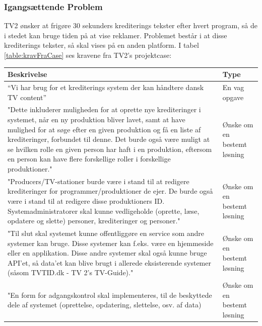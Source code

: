 \subsubsection{Igangsættende Problem}
TV2 ønsker at frigøre 30 sekunders krediterings tekster efter hvert program, så de i stedet kan bruge tiden på at vise reklamer. Problemet består i at disse krediterings tekster, så skal vises på en anden platform. I tabel \ref{table:kravFraCase} ses kravene fra TV2's projektcase: \\

\begin{table}[ht]
    \begin{tabularx}{\textwidth}{|p{10cm}|X|}
        \hline
        \textbf{Beskrivelse} & \textbf{Type} \\
        \hline
        “Vi har brug for  et krediterings system der kan  håndtere  dansk TV content” 
        & En vag opgave \\
        
        \hline
        "Dette inkluderer muligheden for at oprette nye krediteringer i systemet, når en ny produktion bliver lavet, samt at have mulighed for at søge efter en given produktion og få en liste af krediteringer, forbundet til denne. Det burde også være muligt at se hvilken rolle en given person har haft i en produktion, eftersom en person kan have flere forskellige roller i forskellige produktioner."
        & Ønske om en bestemt løsning \\
        
        \hline 
        "Producers/TV-stationer burde være i stand til at redigere krediteringer for programmer/produktioner de ejer. De burde også være i stand til at redigere disse produktioners ID. Systemadministratorer skal kunne vedligeholde (oprette, læse, opdatere og slette) personer, krediteringer og personer."
        & Ønske om en bestemt løsning \\
        
        \hline
        "Til slut skal systemet kunne offentliggøre en service som andre systemer kan bruge. Disse systemer kan f.eks. være en hjemmeside eller en applikation. Disse andre systemer skal også kunne bruge API'et, så data'et kan blive brugt i allerede eksisterende systemer (såsom TVTID.dk - TV 2's TV-Guide)."
        & Ønske om en bestemt løsning \\
        
        \hline
        "En form for adgangskontrol skal implementeres, til de beskyttede dele af systemet (oprettelse, opdatering, slettelse, osv. af data)
        & Ønske om en bestemt løsning \\
        

\end{tabularx}
\end{table}
